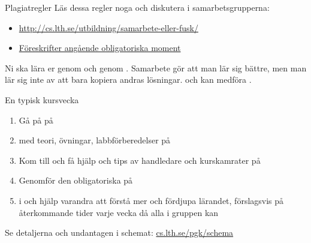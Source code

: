 \begin{Slide}{Plagiatregler}
Läs dessa regler noga och diskutera i samarbetsgrupperna:
\begin{itemize}
\footnotesize
\item \url{http://cs.lth.se/utbildning/samarbete-eller-fusk/}
\item \href{http://cs.lth.se/utbildning/foereskrifter-angaaende-obligatoriska-moment/}{Föreskrifter angående obligatoriska moment}
\end{itemize}
Ni ska lära er genom  och genom  . Samarbete gör att man lär sig bättre, men man lär sig inte av att bara kopiera andras lösningar.  och kan medföra .
\end{Slide}

\fi %

\begin{Slide}{En typisk kursvecka}
\begin{enumerate}
\item Gå på  på 
\item {}  med teori, övningar, labbförberedelser på  
\item Kom till  och få hjälp och tips av handledare och kurskamrater på 
\item Genomför den obligatoriska  på 
\item {} i  och hjälp varandra att förstå mer och fördjupa lärandet, förslagsvis på återkommande tider varje vecka då alla i gruppen kan
\end{enumerate}
Se detaljerna och undantagen i schemat: \href{http://cs.lth.se/pgk/schema}{cs.lth.se/pgk/schema}
\end{Slide}


